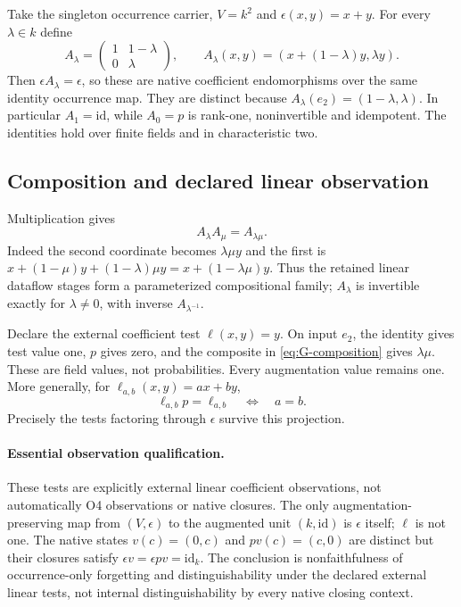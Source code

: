 \documentclass[11pt,a4paper]{article}
\theoremstyle{definition}
\newcommand{\id}{\mathrm{id}}
\begin{document}
Take the singleton occurrence carrier, $V=k^2$ and
$\epsilon(x,y)=x+y$. For every $\lambda\in k$ define
\begin{equation}\label{eq:G-matrix}
A_\lambda=
\begin{pmatrix}1&1-\lambda\\0&\lambda\end{pmatrix},\qquad
A_\lambda(x,y)=(x+(1-\lambda)y,\lambda y).
\end{equation}
Then $\epsilon A_\lambda=\epsilon$, so these are native coefficient
endomorphisms over the same identity occurrence map. They are distinct
because $A_\lambda(e_2)=(1-\lambda,\lambda)$. In particular
$A_1=\id$, while $A_0=p$ is rank-one, noninvertible and idempotent.
The identities hold over finite fields and in characteristic two.

\subsection{Composition and declared linear observation}
Multiplication gives
\begin{equation}\label{eq:G-composition}
A_\lambda A_\mu=A_{\lambda\mu}.
\end{equation}
Indeed the second coordinate becomes $\lambda\mu y$ and the first is
$x+(1-\mu)y+(1-\lambda)\mu y=x+(1-\lambda\mu)y$.
Thus the retained linear dataflow stages form a parameterized
compositional family; $A_\lambda$ is invertible exactly for
$\lambda\ne0$, with inverse $A_{\lambda^{-1}}$.

Declare the external coefficient test $\ell(x,y)=y$. On input $e_2$,
the identity gives test value one, $p$ gives zero, and the composite in
\eqref{eq:G-composition} gives $\lambda\mu$. These are field values,
not probabilities. Every augmentation value remains one. More generally,
for $\ell_{a,b}(x,y)=ax+by$,
\[
\ell_{a,b}p=\ell_{a,b}\quad\Longleftrightarrow\quad a=b.
\]
Precisely the tests factoring through $\epsilon$ survive this projection.

\paragraph{Essential observation qualification.}
These tests are explicitly external linear coefficient observations,
not automatically O4 observations or native closures. The only
augmentation-preserving map from $(V,\epsilon)$ to the augmented unit
$(k,\id)$ is $\epsilon$ itself; $\ell$ is not one. The native states
$v(c)=(0,c)$ and $pv(c)=(c,0)$ are distinct but their closures satisfy
$\epsilon v=\epsilon pv=\id_k$. The conclusion is nonfaithfulness of
occurrence-only forgetting and distinguishability under the declared
external linear tests, not internal distinguishability by every native
closing context.
\end{document}
